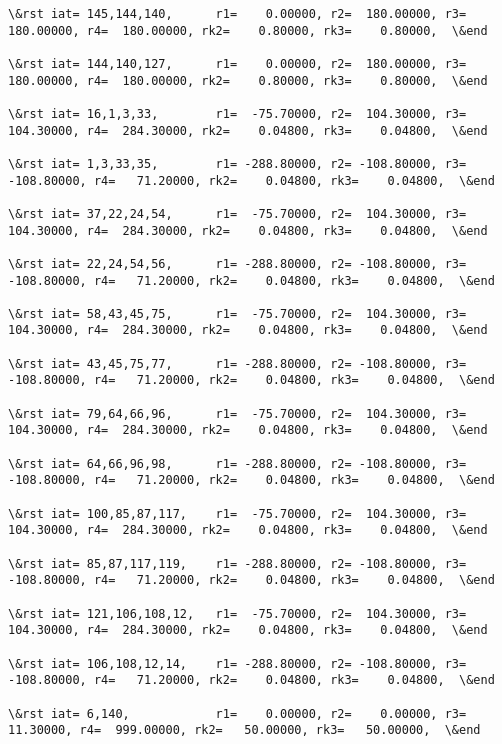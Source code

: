 \documentclass[11pt]{article}
\begin{document}
\begin{Verbatim}[commandchars=\\\{\}]
\&rst iat= 145,144,140,      r1=    0.00000, r2=  180.00000, r3=  180.00000, r4=  180.00000, rk2=    0.80000, rk3=    0.80000,  \&end

\&rst iat= 144,140,127,      r1=    0.00000, r2=  180.00000, r3=  180.00000, r4=  180.00000, rk2=    0.80000, rk3=    0.80000,  \&end

\&rst iat= 16,1,3,33,        r1=  -75.70000, r2=  104.30000, r3=  104.30000, r4=  284.30000, rk2=    0.04800, rk3=    0.04800,  \&end

\&rst iat= 1,3,33,35,        r1= -288.80000, r2= -108.80000, r3= -108.80000, r4=   71.20000, rk2=    0.04800, rk3=    0.04800,  \&end

\&rst iat= 37,22,24,54,      r1=  -75.70000, r2=  104.30000, r3=  104.30000, r4=  284.30000, rk2=    0.04800, rk3=    0.04800,  \&end

\&rst iat= 22,24,54,56,      r1= -288.80000, r2= -108.80000, r3= -108.80000, r4=   71.20000, rk2=    0.04800, rk3=    0.04800,  \&end

\&rst iat= 58,43,45,75,      r1=  -75.70000, r2=  104.30000, r3=  104.30000, r4=  284.30000, rk2=    0.04800, rk3=    0.04800,  \&end

\&rst iat= 43,45,75,77,      r1= -288.80000, r2= -108.80000, r3= -108.80000, r4=   71.20000, rk2=    0.04800, rk3=    0.04800,  \&end

\&rst iat= 79,64,66,96,      r1=  -75.70000, r2=  104.30000, r3=  104.30000, r4=  284.30000, rk2=    0.04800, rk3=    0.04800,  \&end

\&rst iat= 64,66,96,98,      r1= -288.80000, r2= -108.80000, r3= -108.80000, r4=   71.20000, rk2=    0.04800, rk3=    0.04800,  \&end

\&rst iat= 100,85,87,117,    r1=  -75.70000, r2=  104.30000, r3=  104.30000, r4=  284.30000, rk2=    0.04800, rk3=    0.04800,  \&end

\&rst iat= 85,87,117,119,    r1= -288.80000, r2= -108.80000, r3= -108.80000, r4=   71.20000, rk2=    0.04800, rk3=    0.04800,  \&end

\&rst iat= 121,106,108,12,   r1=  -75.70000, r2=  104.30000, r3=  104.30000, r4=  284.30000, rk2=    0.04800, rk3=    0.04800,  \&end

\&rst iat= 106,108,12,14,    r1= -288.80000, r2= -108.80000, r3= -108.80000, r4=   71.20000, rk2=    0.04800, rk3=    0.04800,  \&end

\&rst iat= 6,140,            r1=    0.00000, r2=    0.00000, r3=   11.30000, r4=  999.00000, rk2=   50.00000, rk3=   50.00000,  \&end


\end{Verbatim}
\end{document}
